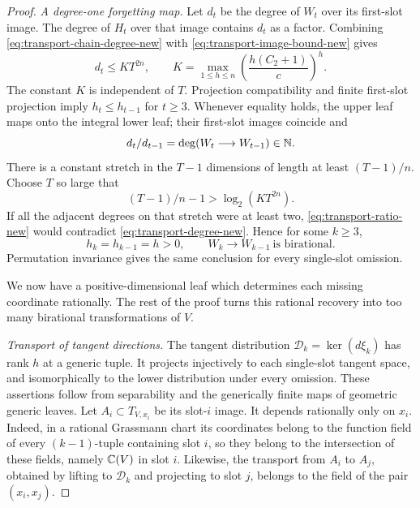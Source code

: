\begin{proof}
\medskip\noindent\emph{A degree-one forgetting map.}
Let $d_t$ be the degree of $W_t$ over its first-slot image.
The degree of $H_t$ over that image contains $d_t$ as a factor.
Combining \eqref{eq:transport-chain-degree-new} with
\eqref{eq:transport-image-bound-new} gives
\begin{equation}\label{eq:transport-degree-new}
 d_t\le KT^{2n},\qquad
 K=\max_{1\le h\le n}\left(\frac{h(C_2+1)}c\right)^h.
\end{equation}
The constant $K$ is independent of $T$.
Projection compatibility and finite first-slot projection imply
$h_t\le h_{t-1}$ for $t\ge3$. Whenever equality holds, the
upper leaf maps onto the integral lower leaf; their first-slot
images coincide and
\begin{equation}\label{eq:transport-ratio-new}
 d_t/d_{t-1}=\deg(W_t\longrightarrow W_{t-1})\in\mathbb N.
\end{equation}
There is a constant stretch in the $T-1$ dimensions of length
at least $(T-1)/n$. Choose $T$ so large that
\[
 (T-1)/n-1>\log_2(KT^{2n}).
\]
If all the adjacent degrees on that stretch were at least two,
\eqref{eq:transport-ratio-new} would contradict
\eqref{eq:transport-degree-new}. Hence for some $k\ge3$,
\begin{equation}\label{eq:transport-degree-one-new}
 h_k=h_{k-1}=h>0,\qquad
 W_k\longrightarrow W_{k-1}\ \text{is birational}.
\end{equation}
Permutation invariance gives the same conclusion for every
single-slot omission.

We now have a positive-dimensional leaf which determines each
missing coordinate rationally. The rest of the proof turns this
rational recovery into too many birational transformations of $V$.

\medskip\noindent\emph{Transport of tangent directions.}
The tangent distribution $\mathcal D_k=\ker(d\xi_k)$ has rank
$h$ at a generic tuple. It projects injectively to each single-slot
tangent space, and isomorphically to the lower distribution under
every omission. These assertions follow from separability and the
generically finite maps of geometric generic leaves.
Let $A_i\subset T_{V,x_i}$ be its slot-$i$ image. It depends
rationally only on $x_i$. Indeed, in a rational Grassmann chart
its coordinates belong to the function field of every
$(k-1)$-tuple containing slot $i$, so they belong to the
intersection of these fields, namely $\mathbb C(V)$ in slot $i$.
Likewise, the transport from $A_i$ to $A_j$, obtained by lifting
to $\mathcal D_k$ and projecting to slot $j$, belongs to the
field of the pair $(x_i,x_j)$.


\end{proof}
